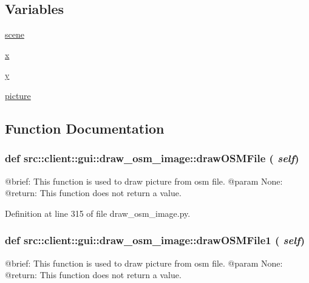 \subsection*{Variables}
\begin{DoxyCompactItemize}
\item 
\hyperlink{namespacesrc_1_1client_1_1gui_1_1draw__osm__image_a11bf1365d49e039c121275398c1c00c6}{scene}
\item 
\hyperlink{namespacesrc_1_1client_1_1gui_1_1draw__osm__image_a256ff1e29938ae97cbe505494572f05c}{x}
\item 
\hyperlink{namespacesrc_1_1client_1_1gui_1_1draw__osm__image_aeb8dd369410a9142602403ce56f4d0f9}{y}
\item 
\hyperlink{namespacesrc_1_1client_1_1gui_1_1draw__osm__image_aa19d15bc963a5227e05b17974db4f18a}{picture}
\end{DoxyCompactItemize}


\subsection{Function Documentation}
\hypertarget{namespacesrc_1_1client_1_1gui_1_1draw__osm__image_ad1556ec41484df3657354576a4bfadee}{
\subsubsection[{drawOSMFile}]{\setlength{\rightskip}{0pt plus 5cm}def src::client::gui::draw\_\-osm\_\-image::drawOSMFile ( {\em self})}}
\label{namespacesrc_1_1client_1_1gui_1_1draw__osm__image_ad1556ec41484df3657354576a4bfadee}
\begin{DoxyVerb}
@brief: This function is used to draw picture from osm file.
@param None:
@return: This function does not return a value.
\end{DoxyVerb}
 

Definition at line 315 of file draw\_\-osm\_\-image.py.

\hypertarget{namespacesrc_1_1client_1_1gui_1_1draw__osm__image_adc97185c793e8fae765cf4baef03105d}{
\subsubsection[{drawOSMFile1}]{\setlength{\rightskip}{0pt plus 5cm}def src::client::gui::draw\_\-osm\_\-image::drawOSMFile1 ( {\em self})}}
\label{namespacesrc_1_1client_1_1gui_1_1draw__osm__image_adc97185c793e8fae765cf4baef03105d}
\begin{DoxyVerb}
@brief: This function is used to draw picture from osm file.
@param None:
@return: This function does not return a value.
\end{DoxyVerb}
 

